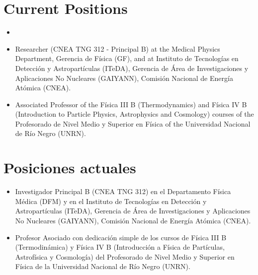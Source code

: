 \ifeng
\section*{Current Positions}
\begin{itemize}
    \item \item {} Researcher (CNEA TNG 312 - Principal B) at the Medical Physics Department, Gerencia de Física (GF), and at Instituto de Tecnologías en Detección y Astropartículas (ITeDA), Gerencia de Área de Investigaciones y Aplicaciones No Nucleares (GAIYANN), Comisión Nacional de Energía Atómica (CNEA).
    \item {} Associated Professor of the Física III B (Thermodynamics) and Física IV B (Introduction to Particle Physics, Astrophysics and Cosmology) courses of the Profesorado de Nivel Medio y Superior en Física of the Universidad Nacional de Río Negro (UNRN).
\end{itemize}
\else
\section*{Posiciones actuales}
\begin{itemize}
    \item {} Investigador Principal B (CNEA TNG 312) en el Departamento Física Médica (DFM) y en el Instituto de Tecnologías en Detección y Astropartículas (ITeDA), Gerencia de Área de Investigaciones y Aplicaciones No Nucleares (GAIYANN), Comisión Nacional de Energía Atómica (CNEA).
	\item {} Profesor Asociado con dedicación simple de los cursos de Física III B (Termodinámica) y Física IV B (Introducción a Física de Partículas, Astrofísica y Cosmología) del Profesorado de Nivel Medio y Superior en Física de la Universidad Nacional de Río Negro (UNRN).
\end{itemize}
\fi

